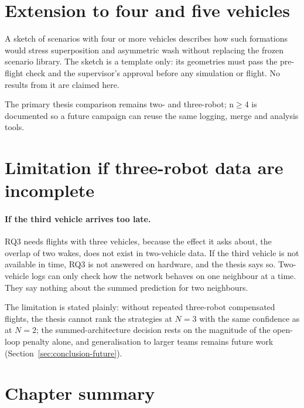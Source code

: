 \section{Extension to four and five vehicles}
\label{sec:res3-n4sketch}

A sketch of scenarios with four or more vehicles describes how such formations would stress
superposition and asymmetric wash without replacing the frozen scenario library. The sketch is a
template only: its geometries must pass the pre-flight check and the supervisor's approval before any
simulation or flight. No results from it are claimed here.

The primary thesis comparison remains two- and three-robot; n$\geq$4 is documented so a future
campaign can reuse the same logging, merge and analysis tools.

\section{Limitation if three-robot data are incomplete}
\label{sec:res3-limitation}

\paragraph{If the third vehicle arrives too late.}
RQ3 needs flights with three vehicles, because the effect it asks about, the overlap of two wakes,
does not exist in two-vehicle data. If the third vehicle is not available in time, RQ3 is not
answered on hardware, and the thesis says so. Two-vehicle logs can only check how the network behaves
on one neighbour at a time. They say nothing about the summed prediction for two neighbours.

The limitation is stated plainly: without repeated three-robot compensated flights, the thesis
cannot rank the strategies at $N=3$ with the same confidence as at $N=2$; the summed-architecture
decision rests on the magnitude of the open-loop penalty alone, and generalisation
to larger teams remains future work (Section~\ref{sec:conclusion-future}).

\section{Chapter summary}
\label{sec:res3-summary}

